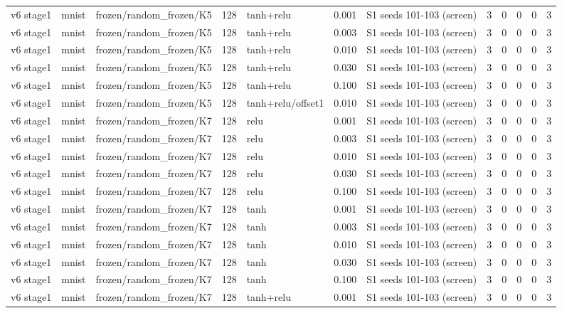 \begin{table}[htbp]
{\begin{tabular}{@{}lllrlrlrrrrr@{}}
v6 stage1 & mnist & frozen/random\_frozen/K5 & 128 & tanh+relu & 0.001 & S1 seeds 101-103 (screen) & 3 & 0 & 0 & 0 & 3 \\
v6 stage1 & mnist & frozen/random\_frozen/K5 & 128 & tanh+relu & 0.003 & S1 seeds 101-103 (screen) & 3 & 0 & 0 & 0 & 3 \\
v6 stage1 & mnist & frozen/random\_frozen/K5 & 128 & tanh+relu & 0.010 & S1 seeds 101-103 (screen) & 3 & 0 & 0 & 0 & 3 \\
v6 stage1 & mnist & frozen/random\_frozen/K5 & 128 & tanh+relu & 0.030 & S1 seeds 101-103 (screen) & 3 & 0 & 0 & 0 & 3 \\
v6 stage1 & mnist & frozen/random\_frozen/K5 & 128 & tanh+relu & 0.100 & S1 seeds 101-103 (screen) & 3 & 0 & 0 & 0 & 3 \\
v6 stage1 & mnist & frozen/random\_frozen/K5 & 128 & tanh+relu/offset1 & 0.010 & S1 seeds 101-103 (screen) & 3 & 0 & 0 & 0 & 3 \\
v6 stage1 & mnist & frozen/random\_frozen/K7 & 128 & relu & 0.001 & S1 seeds 101-103 (screen) & 3 & 0 & 0 & 0 & 3 \\
v6 stage1 & mnist & frozen/random\_frozen/K7 & 128 & relu & 0.003 & S1 seeds 101-103 (screen) & 3 & 0 & 0 & 0 & 3 \\
v6 stage1 & mnist & frozen/random\_frozen/K7 & 128 & relu & 0.010 & S1 seeds 101-103 (screen) & 3 & 0 & 0 & 0 & 3 \\
v6 stage1 & mnist & frozen/random\_frozen/K7 & 128 & relu & 0.030 & S1 seeds 101-103 (screen) & 3 & 0 & 0 & 0 & 3 \\
v6 stage1 & mnist & frozen/random\_frozen/K7 & 128 & relu & 0.100 & S1 seeds 101-103 (screen) & 3 & 0 & 0 & 0 & 3 \\
v6 stage1 & mnist & frozen/random\_frozen/K7 & 128 & tanh & 0.001 & S1 seeds 101-103 (screen) & 3 & 0 & 0 & 0 & 3 \\
v6 stage1 & mnist & frozen/random\_frozen/K7 & 128 & tanh & 0.003 & S1 seeds 101-103 (screen) & 3 & 0 & 0 & 0 & 3 \\
v6 stage1 & mnist & frozen/random\_frozen/K7 & 128 & tanh & 0.010 & S1 seeds 101-103 (screen) & 3 & 0 & 0 & 0 & 3 \\
v6 stage1 & mnist & frozen/random\_frozen/K7 & 128 & tanh & 0.030 & S1 seeds 101-103 (screen) & 3 & 0 & 0 & 0 & 3 \\
v6 stage1 & mnist & frozen/random\_frozen/K7 & 128 & tanh & 0.100 & S1 seeds 101-103 (screen) & 3 & 0 & 0 & 0 & 3 \\
v6 stage1 & mnist & frozen/random\_frozen/K7 & 128 & tanh+relu & 0.001 & S1 seeds 101-103 (screen) & 3 & 0 & 0 & 0 & 3 \\

\end{tabular}}
\end{table}
